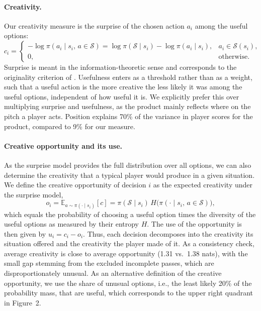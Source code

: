 \paragraph{Creativity.} Our creativity measure is the surprise of the chosen action $a_i$ among the useful options:
\begin{equation*}
c_i = \begin{cases} -\log \pi(a_i \mid s_i,\, a \in \mathcal{S}) = \log \pi(\mathcal{S} \mid s_i) - \log \pi(a_i \mid s_i), & a_i \in \mathcal{S}(s_i),\\ 0, & \text{otherwise.}\end{cases}
\end{equation*}
Surprise is meant in the information-theoretic sense \parencite{shannon1948mathematical} and corresponds to the
originality criterion of \textcite{simonton2012taking}. Usefulness enters as a threshold rather than as a weight, such
that a useful action is the more creative the less likely it was among the useful options, independent of how useful
it is. We explicitly prefer this over multiplying surprise and usefulness, as the product mainly reflects where on the
pitch a player acts. Position explains 70\% of the variance in player scores for the product, compared to 9\% for our
measure.

\paragraph{Creative opportunity and its use.} As the surprise model provides the full distribution over all options,
we can also determine the creativity that a typical player would produce in a given situation. We define the creative
opportunity of decision $i$ as the expected creativity under the surprise model,
\begin{equation*}
o_i = \mathbb{E}_{a \sim \pi(\cdot \mid s_i)}[c] = \pi(\mathcal{S} \mid s_i)\, H\big(\pi(\cdot \mid s_i,\, a \in \mathcal{S})\big),
\end{equation*}
which equals the probability of choosing a useful option times the diversity of the useful options as measured by
their entropy $H$. The use of the opportunity is then given by $u_i = c_i - o_i$. Thus, each decision decomposes into
the creativity its situation offered and the creativity the player made of it. As a consistency check, average
creativity is close to average opportunity (1.31 vs.\ 1.38 nats), with the small gap stemming from the excluded
incomplete passes, which are disproportionately unusual. As an alternative definition of the creative opportunity,
we use the share of unusual options, i.e., the least likely 20\% of the probability mass, that are useful, which
corresponds to the upper right quadrant in Figure~2.

